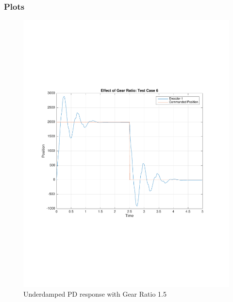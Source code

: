 \documentclass[11pt, a4paper]{article}
\begin{document}
\subsubsection{Plots}
\begin{figure}[H]
\centering
\includegraphics[width = \textwidth]{gr_tc6.pdf}
\caption{Underdamped PD response with Gear Ratio 1.5}
\end{figure}
\end{document}
